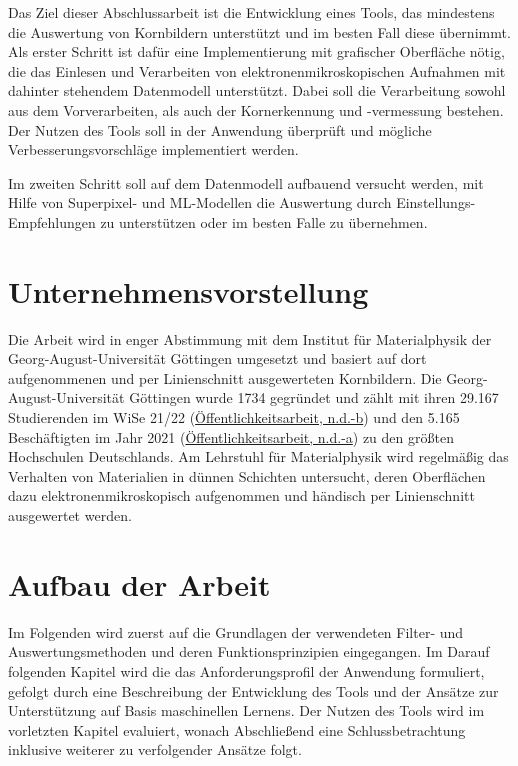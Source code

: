 \documentclass[
  12pt,
]{book}
\begin{document}
Das Ziel dieser Abschlussarbeit ist die Entwicklung eines Tools, das mindestens die Auswertung von Kornbildern unterstützt und im besten Fall diese übernimmt.
Als erster Schritt ist dafür eine Implementierung mit grafischer Oberfläche nötig, die das Einlesen und Verarbeiten von elektronenmikroskopischen Aufnahmen mit dahinter stehendem Datenmodell unterstützt.
Dabei soll die Verarbeitung sowohl aus dem Vorverarbeiten, als auch der Kornerkennung und -vermessung bestehen.
Der Nutzen des Tools soll in der Anwendung überprüft und mögliche Verbesserungsvorschläge implementiert werden.

Im zweiten Schritt soll auf dem Datenmodell aufbauend versucht werden, mit Hilfe von Superpixel- und ML-Modellen die Auswertung durch Einstellungs-Empfehlungen zu unterstützen oder im besten Falle zu übernehmen.

\hypertarget{unternehmensvorstellung}{%
\section{Unternehmensvorstellung}\label{unternehmensvorstellung}}

Die Arbeit wird in enger Abstimmung mit dem Institut für Materialphysik der Georg-August-Universität Göttingen umgesetzt und basiert auf dort aufgenommenen und per Linienschnitt ausgewerteten Kornbildern.
Die Georg-August-Universität Göttingen wurde 1734 gegründet und zählt mit ihren 29.167 Studierenden im WiSe 21/22 (\protect\hyperlink{ref-offentlichkeitsarbeitStudiumUndLehre}{Öffentlichkeitsarbeit, n.d.-b}) und den 5.165 Beschäftigten im Jahr 2021 (\protect\hyperlink{ref-offentlichkeitsarbeitPersonalGeorgAugustUniversitatGottingen}{Öffentlichkeitsarbeit, n.d.-a}) zu den größten Hochschulen Deutschlands. Am Lehrstuhl für Materialphysik wird regelmäßig das Verhalten von Materialien in dünnen Schichten untersucht, deren Oberflächen dazu elektronenmikroskopisch aufgenommen und händisch per Linienschnitt ausgewertet werden.

\hypertarget{aufbau-der-arbeit}{%
\section{Aufbau der Arbeit}\label{aufbau-der-arbeit}}

Im Folgenden wird zuerst auf die Grundlagen der verwendeten Filter- und Auswertungsmethoden und deren Funktionsprinzipien eingegangen.
Im Darauf folgenden Kapitel wird die das Anforderungsprofil der Anwendung formuliert, gefolgt durch eine Beschreibung der Entwicklung des Tools und der Ansätze zur Unterstützung auf Basis maschinellen Lernens.
Der Nutzen des Tools wird im vorletzten Kapitel evaluiert, wonach Abschließend eine Schlussbetrachtung inklusive weiterer zu verfolgender Ansätze folgt.
\end{document}
